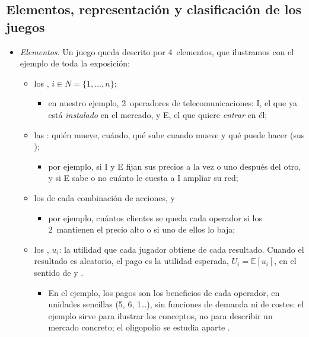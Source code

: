 \documentclass[11pt]{article}
\begin{document}
\subsection{Elementos, representación y clasificación de los juegos}\label{sec:elementos}

\begin{itemize}
\item \emph{Elementos}. Un juego queda descrito por 4~elementos\nocite{MasColellWhinstonGreen1995}, que ilustramos con el ejemplo de toda la exposición:
  \begin{itemize}
  \item los , $i\in N=\{1,\dots,n\}$;
    \begin{itemize}
    \item en nuestro ejemplo, 2~operadores de telecomunicaciones: \textup{I}, el que ya está \emph{instalado} en el mercado, y E, el que quiere \emph{entrar} en él;
    \end{itemize}
  \item las : quién mueve, cuándo, qué sabe cuando mueve y qué puede hacer (sus );
    \begin{itemize}
    \item por ejemplo, si \textup{I} y E fijan sus precios a la vez o uno después del otro, y si E sabe o no cuánto le cuesta a \textup{I} ampliar su red;
    \end{itemize}
  \item los  de cada combinación de acciones, y
    \begin{itemize}
    \item por ejemplo, cuántos clientes se queda cada operador si los 2~mantienen el precio alto o si uno de ellos lo baja;
    \end{itemize}
  \item los , $u_i$: la utilidad que cada jugador obtiene de cada resultado. Cuando el resultado es aleatorio, el pago es la utilidad esperada, $U_i=\mathbb{E}[u_i]$, en el sentido de  y  .
    \begin{itemize}
    \item En el ejemplo, los pagos son los beneficios de cada operador, en unidades sencillas (5, 6, 1…), sin funciones de demanda ni de costes: el ejemplo sirve para ilustrar los conceptos, no para describir un mercado concreto; el oligopolio se estudia aparte .

\end{itemize}
\end{itemize}
\end{itemize}
\end{document}
